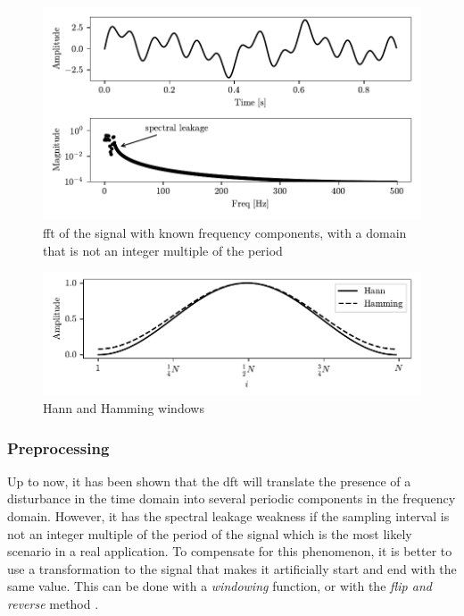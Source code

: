 \begin{figure}
    \centering
    \includegraphics[scale=1]{images/FeatureExtraction/FD_known_outofsync.pdf}
    \caption{\gls{fft} of the signal with known frequency components, with a domain that is not an integer multiple of the period}
    \label{fig:FD_known_leackage}
\end{figure}

\begin{figure}
    \centering
    \includegraphics[scale=1]{images/FeatureExtraction/windows.pdf}
    \caption{Hann and Hamming windows}
    \label{fig:windows}
\end{figure} 


\subsubsection{Preprocessing}
Up to now, it has been shown that the \gls{dft} will translate the presence of a disturbance in the time domain into several periodic components in the frequency domain. However, it has the spectral leakage weakness if the sampling interval is not an integer multiple of the period of the signal which is the most likely scenario in a real application. To compensate for this phenomenon, it is better to use a transformation to the signal that makes it artificially start and end with the same value. This can be done with a \emph{windowing} function, or with the \emph{flip and reverse} method \cite{Preprocessing}. 

